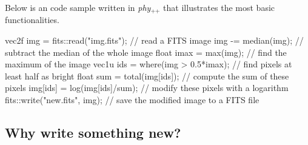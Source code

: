 \documentclass[12pt]{report}
\newcommand{\phypp}{\textit{phy}$_{\text{++}}$\xspace}
\begin{document}
Below is an code sample written in \phypp that illustrates the most basic functionalities.

\begin{cppcode}
vec2f img = fits::read("img.fits"); // read a FITS image
img -= median(img);                 // subtract the median of the whole image
float imax = max(img);              // find the maximum of the image
vec1u ids = where(img > 0.5*imax);  // find pixels at least half as bright
float sum = total(img[ids]);        // compute the sum of these pixels
img[ids] = log(img[ids]/sum);       // modify these pixels with a logarithm
fits::write("new.fits", img);       // save the modified image to a FITS file
\end{cppcode}

\subsection{Why write something new?}
\end{document}
